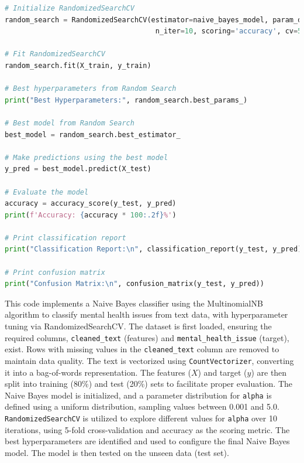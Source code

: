 \begin{tcolorbox}[colback=gray!5!white, colframe=gray!80!black, boxrule=0.5pt, title=Naive Bayes]
    \begin{lstlisting}[language=Python]
# Initialize RandomizedSearchCV
random_search = RandomizedSearchCV(estimator=naive_bayes_model, param_distributions=param_distributions,
                                    n_iter=10, scoring='accuracy', cv=5, n_jobs=-1, random_state=42)

# Fit RandomizedSearchCV
random_search.fit(X_train, y_train)

# Best hyperparameters from Random Search
print("Best Hyperparameters:", random_search.best_params_)

# Best model from Random Search
best_model = random_search.best_estimator_

# Make predictions using the best model
y_pred = best_model.predict(X_test)

# Evaluate the model
accuracy = accuracy_score(y_test, y_pred)
print(f'Accuracy: {accuracy * 100:.2f}%')

# Print classification report
print("Classification Report:\n", classification_report(y_test, y_pred))

# Print confusion matrix
print("Confusion Matrix:\n", confusion_matrix(y_test, y_pred))        
    \end{lstlisting}
\end{tcolorbox}

\noindent
This code implements a Naive Bayes classifier using the MultinomialNB algorithm to classify mental health issues from text data, with hyperparameter tuning via RandomizedSearchCV. The dataset is first loaded, ensuring the required columns, \texttt{cleaned\_text} (features) and \texttt{mental\_health\_issue} (target), exist. Rows with missing values in the \texttt{cleaned\_text} column are removed to maintain data quality. The text is vectorized using \texttt{CountVectorizer}, converting it into a bag-of-words representation. The features (\(X\)) and target (\(y\)) are then split into training (80\%) and test (20\%) sets to facilitate proper evaluation. The Naive Bayes model is initialized, and a parameter distribution for \texttt{alpha} is defined using a uniform distribution, sampling values between 0.001 and 5.0. \texttt{RandomizedSearchCV} is utilized to explore different values for \texttt{alpha} over 10 iterations, using 5-fold cross-validation and accuracy as the scoring metric. The best hyperparameters are identified and used to configure the final Naive Bayes model. The model is then tested on the unseen data (test set).

